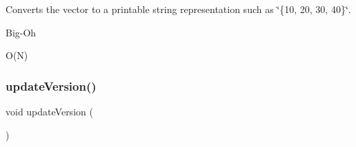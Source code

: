 Converts the vector to a printable string representation such as \char`\"{}\{10, 20, 30, 40\}\char`\"{}. 

\begin{DoxyRefDesc}{Big-\/\+Oh}
\item[\mbox{\hyperlink{BigOh__BigOh000134}{Big-\/\+Oh}}]O(\+N) \end{DoxyRefDesc}
\mbox{\label{classVector_ad1aea0de96f7197055bac8bf8aba7f32}} 
\subsubsection{\texorpdfstring{update\+Version()}{updateVersion()}}
{\footnotesize\ttfamily void update\+Version (\begin{DoxyParamCaption}{ }\end{DoxyParamCaption})}

